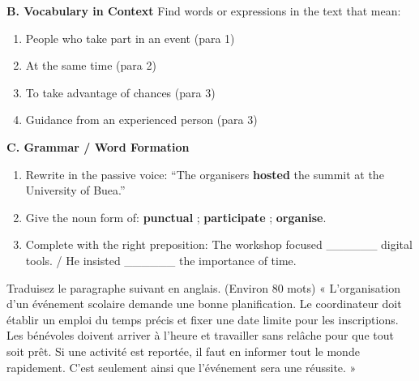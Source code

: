 \documentclass[11pt]{article}
\begin{document}
\begin{exercice}
\textbf{B. Vocabulary in Context}
Find words or expressions in the text that mean:
\begin{enumerate}
\item People who take part in an event (para 1)
\item At the same time (para 2)
\item To take advantage of chances (para 3)
\item Guidance from an experienced person (para 3)
\end{enumerate}

\textbf{C. Grammar / Word Formation}
\begin{enumerate}
\item Rewrite in the passive voice: “The organisers \textbf{hosted} the summit at the University of Buea.”
\item Give the noun form of: \textbf{punctual} ; \textbf{participate} ; \textbf{organise}.
\item Complete with the right preposition: The workshop focused \_\_\_\_\_\_ digital tools. / He insisted \_\_\_\_\_\_ the importance of time.
\end{enumerate}
\end{exercice}

\begin{exercice}
Traduisez le paragraphe suivant en anglais. (Environ 80 mots)
« L'organisation d'un événement scolaire demande une bonne planification. Le coordinateur doit établir un emploi du temps précis et fixer une date limite pour les inscriptions. Les bénévoles doivent arriver à l'heure et travailler sans relâche pour que tout soit prêt. Si une activité est reportée, il faut en informer tout le monde rapidement. C'est seulement ainsi que l'événement sera une réussite. »
\end{exercice}
\end{document}
